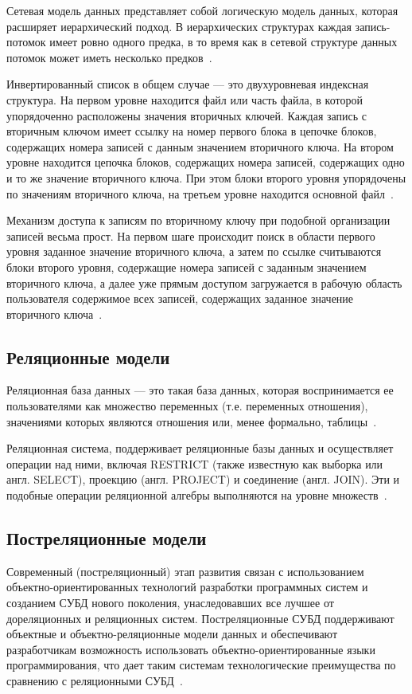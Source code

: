 Сетевая модель данных представляет собой логическую модель данных, которая расширяет иерархический подход. В иерархических структурах каждая запись-потомок имеет ровно одного предка, в то время как в сетевой структуре данных потомок может иметь несколько предков~\cite{wolf-db}.

Инвертированный список в общем случае — это двухуровневая индексная структура. На первом уровне находится файл или часть файла, в которой упорядоченно расположены значения вторичных ключей. Каждая запись с вторичным ключом имеет ссылку на номер первого блока в цепочке блоков, содержащих номера записей с данным значением вторичного ключа. На втором уровне находится цепочка блоков, содержащих номера записей, содержащих одно и то же значение вторичного ключа. При этом блоки второго уровня упорядочены по значениям вторичного ключа, на третьем уровне находится основной файл~\cite{inverted-lists}.

Механизм доступа к записям по вторичному ключу при подобной организации записей весьма прост. На первом шаге происходит поиск в области первого уровня заданное значение вторичного ключа, а затем по ссылке считываются блоки второго уровня, содержащие номера записей с заданным значением вторичного ключа, а далее уже прямым доступом загружается в рабочую область пользователя содержимое всех записей, содержащих заданное значение вторичного ключа~\cite{inverted-lists}.


\subsection{Реляционные модели}
Реляционная база данных — это такая база данных, которая воспринимается ее пользователями как множество переменных (т.е. переменных отношения), значениями которых являются отношения или, менее формально, таблицы~\cite{williams-db}.

Реляционная система, поддерживает реляционные базы данных и осуществляет операции над ними, включая RESTRICT (также известную как выборка или англ. SELECT), проекцию (англ. PROJECT) и соединение (англ. JOIN). Эти и подобные операции реляционной алгебры выполняются на уровне множеств~\cite{williams-db}.

\subsection{Постреляционные модели}
Современный (постреляционный) этап развития связан с использованием объектно-ориентированных технологий разработки программных систем и созданием СУБД нового поколения, унаследовавших все лучшее от дореляционных и реляционных систем. Постреляционные СУБД поддерживают 
объектные и объектно-реляционные модели данных и обеспечивают разработчикам возможность использовать объектно-ориентированные языки программирования, что дает таким системам технологические преимущества по сравнению с реляционными СУБД~\cite{wolf-db}.

